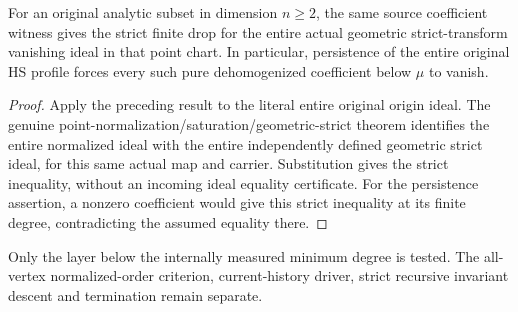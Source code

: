 \begin{theorem}
\label{hir:actual-geometric-point-low-tangent-coefficient-strict-hs-drop}
\leanok
For an original analytic subset in dimension $n\ge2$, the same source
coefficient witness gives the strict finite drop for the entire actual
geometric strict-transform vanishing ideal in that point chart. In
particular, persistence of the entire original HS profile forces every
such pure dehomogenized coefficient below $\mu$ to vanish.
\end{theorem}
\begin{proof}
Apply the preceding result to the literal entire original origin ideal.
The genuine point-normalization/saturation/geometric-strict theorem
identifies the entire normalized ideal with the entire independently
defined geometric strict ideal, for this same actual map and carrier.
Substitution gives the strict inequality, without an incoming ideal
equality certificate. For the persistence assertion, a nonzero
coefficient would give this strict inequality at its finite degree,
contradicting the assumed equality there.
\end{proof}

Only the layer below the internally measured minimum degree is tested.
The all-vertex normalized-order criterion, current-history driver,
strict recursive invariant descent and termination remain separate.
